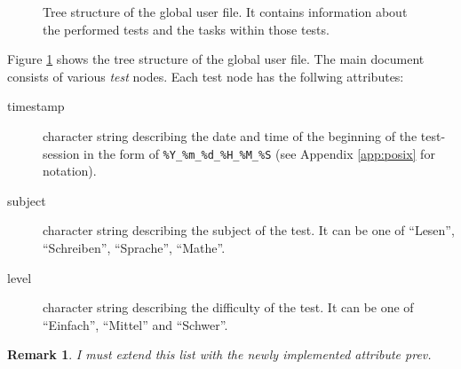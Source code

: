 \documentclass{scrartcl}
\newtheorem{remark}{Remark}
\begin{document}
\begin{figure}
\begin{center}
\end{center}
\caption{Tree structure of the global user file. It contains information about the performed tests and the tasks within those tests.}
\label{fig:guf}
\end{figure}
Figure \ref{fig:guf} shows the tree structure of the global user file. The main document consists of various \emph{test} nodes. Each test node has the follwing attributes:
\begin{description}
\item[timestamp] character string describing the date and time of the beginning of the test-session in the form of \verb+%Y_%m_%d_%H_%M_%S+ (see Appendix \ref{app:posix} for notation).
\item[subject] character string describing the subject of the test. It can be one of ``Lesen'', ``Schreiben'', ``Sprache'', ``Mathe''.
\item[level] character string describing the difficulty of the test. It can be one of ``Einfach'', ``Mittel'' and ``Schwer''. 
\end{description}
\begin{remark}
I must extend this list with the newly implemented attribute \emph{prev}.
\end{remark}
\end{document}
